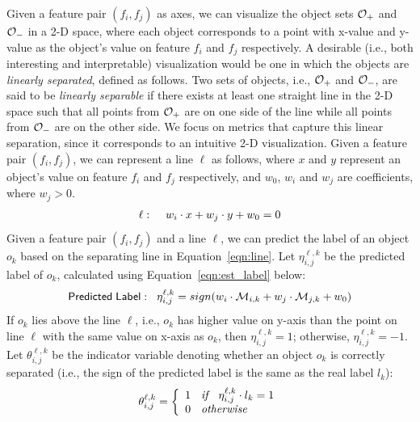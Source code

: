 Given a feature pair $(f_i,f_j)$ as axes, we can visualize the object sets $\oo_+$ and $\oo_-$ in a 2-D space, where each object corresponds to a point with x-value and y-value as the object's value on feature $f_i$ and $f_j$ respectively. A desirable (i.e., both interesting and interpretable) visualization would be one in which the objects are {\em linearly separated}, defined as follows. Two sets of objects, i.e., $\oo_+$ and $\oo_-$, are said to be \emph{linearly separable} if there exists at least one straight line in the 2-D space such that all points from $\oo_+$ are on one side of the line while all points from $\oo_-$ are on the other side. 
We focus on metrics that capture this linear separation, since it corresponds to an intuitive 2-D visualization.
Given a feature pair $(f_i,f_j)$, we can represent a line $\ell$ as follows, where $x$ and $y$ represent an object's value on feature $f_i$ and $f_j$ respectively, and $w_0$, $w_i$ and $w_j$ are coefficients, where $w_j>0$.
\begin{equation}\label{eqn:line}
\begin{split}
\ell: \hspace{4mm} w_i\cdot x + w_j\cdot y +w_0 =0
\end{split}
\end{equation}
Given a feature pair $(f_i,f_j)$ and a line $\ell$, we can predict the label of an object $o_k$ based on the separating line in Equation~\ref{eqn:line}. Let $\eta_{i,j}^{\ell,k}$ be the predicted label of $o_k$, calculated using Equation~\ref{eqn:est_label} below:
\begin{equation}\label{eqn:est_label}
{\sf Predicted \hspace{1mm} Label:}\hspace{3mm} \eta_{i,j}^{\ell,k}=sign(w_i\cdot \mm_{i,k} + w_j\cdot \mm_{j,k} +w_0)
\end{equation}
\noindent If $o_k$ lies above the line $\ell$, i.e., $o_k$ has higher value on y-axis than the point on line $\ell$ with the same value on x-axis as $o_k$, then $\eta_{i,j}^{\ell,k}=1$; otherwise, $\eta_{i,j}^{\ell,k}=-1$. Let $\theta_{i,j}^{\ell,k}$ be the indicator variable denoting whether an object $o_k$ is correctly separated (i.e., the sign of the predicted label is the same as the real label $l_k$):
\begin{equation}\label{eqn:s_object}
\theta_{i,j}^{\ell,k}=\left\{
  \begin{array}{ll}
   1 \textit{\hspace{2mm} if \hspace{2mm}} \eta_{i,j}^{\ell,k}\cdot l_k = 1\\
   0 \textit{\hspace{2mm} otherwise \hspace{2mm}}
  \end{array}
  \right.
\end{equation}


